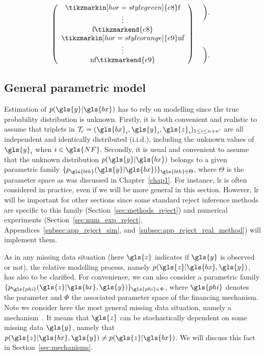 \[\left( \begin{array}{c}
\tikzmarkin[hor=style green]{e8} \text{f} \\
\vdots \\
\text{f} \tikzmarkend{e8} \\ 
\tikzmarkin[hor=style orange]{e9} \text{nf} \\
\vdots \\
\text{nf} \tikzmarkend{e9} \end{array} \right)
 \hspace{0.2cm}
 \begin{array}{c}
\bigg). \\
\\
\\
\\
\bigg). \end{array}
\]


\subsection{General parametric model}

Estimation of $p(\gls{y}|\gls{bx})$ has to rely on modelling since the true probability distribution is unknown. Firstly, it is both convenient and realistic to assume that triplets in $\mathcal{T}_{\text{c}} = (\gls{bx}_i,\gls{y}_i,\gls{z}_i)_{1\le i\le n+n'}$ are all independent and identically distributed (i.i.d.), including the unknown values of $\gls{y}_i$ when $i\in \gls{NF}$. Secondly, it is usual and convenient to assume that the unknown distribution $p(\gls{y}|\gls{bx})$ belongs to a given parametric family $\{p_{\gls{bth}}(\gls{y}|\gls{bx})\}_{\gls{bth} \in\Theta}$, where $\Theta$ is the parameter space as was discussed in Chapter~\ref{chap1}. For instance, \gls{lr} is often considered in practice, even if we will be more general in this section. However, \gls{lr} will be important for other sections since some standard reject inference methods are specific to this family (Section~\ref{sec:methods_reject}) and numerical experiments (Section~\ref{sec:num_exp_reject}, Appendices~\ref{subsec:app_reject_sim}, and~\ref{subsec:app_reject_real_method}) will implement them.

As in any missing data situation (here $\gls{z}$ indicates if $\gls{y}$ is observed or not), the relative modelling process, namely $p(\gls{z}|\gls{bx},\gls{y})$, has also to be clarified. For convenience, we can also consider a parametric family $\{p_{\gls{phi}}(\gls{z}|\gls{bx},\gls{y})\}_{\gls{phi} \in \Phi}$, where $\gls{phi}$ denotes the parameter and $\Phi$ the associated parameter space of the financing mechanism. Note we consider here the most general missing data situation, namely a  mechanism~\cite{littlerubin}. It means that $\gls{z}$ can be stochastically dependent on some missing data $\gls{y}$, namely that $p(\gls{z}|\gls{bx},\gls{y})\neq p(\gls{z}|\gls{bx})$. We will discuss this fact in Section~\ref{sec:mechanisms}.

